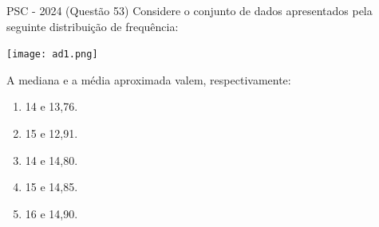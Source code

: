 \documentclass[aspectratio=169]{beamer}
\newif\ifusarcorvermelha
\newcommand{\vermelho}[1]{%
    \ifusarcorvermelha
        {\color{red}#1}%
    \else
        #1%
    \fi
}
\begin{document}
        \begin{frame}{PSC  - 2024 (Questão 53)}
        Considere o conjunto de dados apresentados pela seguinte distribuição de frequência:

        \begin{center}
            \texttt{[image: ad1.png]}
        \end{center} A mediana e a média aproximada valem, respectivamente:
        \begin{enumerate}[a]
            \item 14 e 13,76.
            \item \vermelho{15 e 12,91.}
            \item 14 e 14,80.
            \item 15 e 14,85.
            \item 16 e 14,90.

        \end{enumerate}        
    \end{frame}
\end{document}
